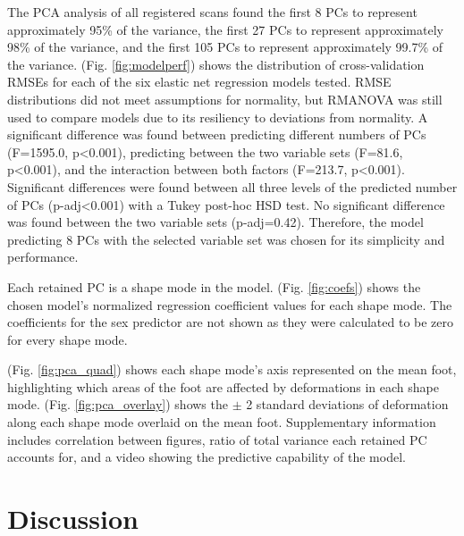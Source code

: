 \documentclass[preprint]{elsarticle}
\begin{document}
The PCA analysis of all registered scans found the first 8 PCs to represent approximately 95\% of the variance, the first 27 PCs to represent approximately 98\% of the variance, and the first 105 PCs to represent approximately 99.7\% of the variance.
(Fig. \ref{fig:modelperf}) shows the distribution of cross-validation RMSEs for each of the six elastic net regression models tested.
RMSE distributions did not meet assumptions for normality, but RMANOVA was still used to compare models due to its resiliency to deviations from normality.
A significant difference was found between predicting different numbers of PCs (F=1595.0, p\textless0.001), predicting between the two variable sets (F=81.6, p\textless0.001), and the interaction between both factors (F=213.7, p\textless0.001).
Significant differences were found between all three levels of the predicted number of PCs (p-adj\textless0.001) with a Tukey post-hoc HSD test.
No significant difference was found between the two variable sets (p-adj=0.42).
Therefore, the model predicting 8 PCs with the selected variable set was chosen for its simplicity and performance.

Each retained PC is a shape mode in the model. (Fig. \ref{fig:coefs}) shows the chosen model's normalized regression coefficient values for each shape mode.
The coefficients for the sex predictor are not shown as they were calculated to be zero for every shape mode.

(Fig. \ref{fig:pca_quad}) shows each shape mode's axis represented on the mean foot, highlighting which areas of the foot are affected by deformations in each shape mode.
(Fig. \ref{fig:pca_overlay}) shows the \(\pm\) 2 standard deviations of deformation along each shape mode overlaid on the mean foot.
Supplementary information includes correlation between figures, ratio of total variance each retained PC accounts for, and a video showing the predictive capability of the model.

\hypertarget{discussion}{%
\section{Discussion}\label{discussion}}
\end{document}
